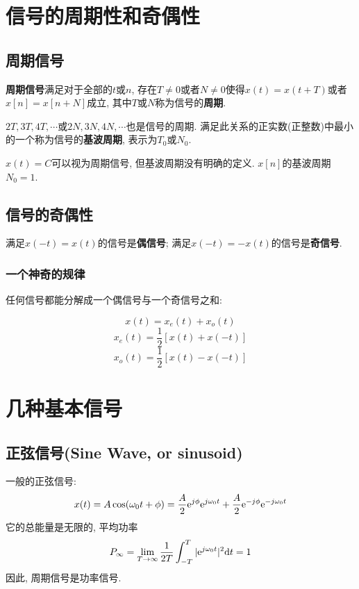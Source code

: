 \section{信号的周期性和奇偶性}

    \subsection{周期信号}

        \textbf{周期信号}满足对于全部的$t$或$n$, 存在$T\neq 0$或者$N\neq 0$使得$x(t)=x(t+T)$或者$x[n]=x[n+N]$成立, 其中$T$或$N$称为信号的\textbf{周期}.

        $2T, 3T, 4T,\cdots$或$2N, 3N, 4N, \cdots$也是信号的周期. 满足此关系的正实数(正整数)中最小的一个称为信号的\textbf{基波周期}, 表示为$T_0$或$N_0$.

        $x(t)=C$可以视为周期信号, 但基波周期没有明确的定义. $x[n]$的基波周期$N_0=1$.

    \subsection{信号的奇偶性}

        满足$x(-t)=x(t)$的信号是\textbf{偶信号}; 满足$x(-t)=-x(t)$的信号是\textbf{奇信号}.

        \subsubsection{一个神奇的规律}

            任何信号都能分解成一个偶信号与一个奇信号之和:

            \[x(t)=x_e(t)+x_o(t)\]
            \[x_e(t)=\frac{1}{2}[x(t)+x(-t)]\]
            \[x_o(t)=\frac{1}{2}[x(t)-x(-t)]\]

\section{几种基本信号}

    \subsection{正弦信号(Sine Wave, or sinusoid)}

        一般的正弦信号:
        \[x(t)=A\cos(\omega_0t+\phi)=\frac{A}{2}\mathrm{e}^{j\phi}\mathrm{e}^{j\omega_0t}+\frac{A}{2}\mathrm{e}^{-j\phi}\mathrm{e}^{-j\omega_0t} \]
        它的总能量是无限的, 平均功率
        \[P_\infty =\lim_{T\to\infty}\frac{1}{2T}\int_{-T}^T|\mathrm{e}^{j\omega_0t}|^2\mathrm{d} t=1\]
        因此, 周期信号是功率信号.

